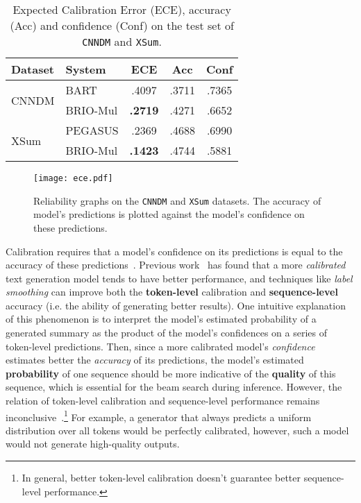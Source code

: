 \documentclass[11pt]{article}
\newcommand{\model}{BRIO\xspace}
\begin{document}
\begin{table}[t]
\centering
\small
\begin{tabular}{llccc}
\toprule
\textbf{Dataset} & \textbf{System} & \textbf{ECE} & \textbf{Acc} & \textbf{Conf}\\
\midrule
 \multirow{2}{*}{CNNDM} & BART & .4097 & .3711 & .7365\\
  & \model-Mul & \textbf{.2719} & .4271 & .6652\\
\midrule
 \multirow{2}{*}{XSum} & PEGASUS & .2369 & .4688 & .6990\\
  & \model-Mul &  \textbf{.1423} & .4744  & .5881\\
\bottomrule
\end{tabular}
\caption{\label{tab:ece} Expected Calibration Error (ECE), accuracy (Acc) and confidence (Conf) on the test set of \texttt{CNNDM} and \texttt{XSum}.}
\end{table}

\begin{figure}[t]
    \centering
    \texttt{[image: ece.pdf]}
    \caption{Reliability graphs on the \texttt{CNNDM} and \texttt{XSum} datasets.
    The accuracy of model's predictions is plotted against the model's confidence on these predictions.}
    \label{fig:ece}
\end{figure}



Calibration requires that a model's confidence on its predictions is equal to the accuracy of these predictions~\citep{pmlr-v70-guo17a}.
Previous work~\citep{NEURIPS2019_f1748d6b, DBLP:journals/corr/abs-1903-00802, wang-etal-2020-inference} has found that a more \textit{calibrated} text generation model tends to have better performance, and 
techniques like \textit{label smoothing} can improve both the \textbf{token-level} calibration and \textbf{sequence-level} accuracy (i.e. the ability of generating better results).
One intuitive explanation of this phenomenon is to interpret the model's estimated probability of a generated summary as the product of the model's confidences on a series of token-level predictions.
Then, since a more calibrated model's \textit{confidence} estimates better the \textit{accuracy} of its predictions, the model's estimated \textbf{probability} of one sequence should be more indicative of the \textbf{quality} of this sequence, which is essential for the beam search during inference. 
However, the relation of token-level calibration and sequence-level performance remains inconclusive~\citep{NEURIPS2019_f1748d6b}.\footnote{In general, better token-level calibration doesn't guarantee better sequence-level performance.} 
For example, a generator that always predicts a uniform distribution over all tokens would be perfectly calibrated, however, such a model would not generate high-quality outputs.
\end{document}
